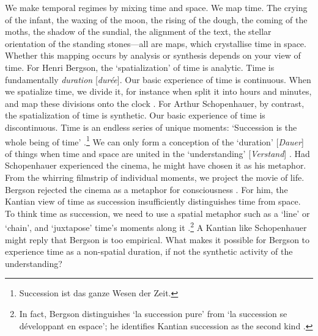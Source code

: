 \documentclass[
  Crown,
  times,
  sageh]{sagej}
\begin{document}
We make temporal regimes by mixing time and space. We map time. The
crying of the infant, the waxing of the moon, the rising of the dough,
the coming of the moths, the shadow of the sundial, the alignment of the
text, the stellar orientation of the standing stones---all are maps,
which crystallise time in space. Whether this mapping occurs by analysis
or synthesis depends on your view of time. For Henri Bergson, the
`spatialization' of time is analytic. Time is fundamentally
\emph{duration} {[}\emph{durée}{]}. Our basic experience of time is
continuous. When we spatialize time, we divide it, for instance when
split it into hours and minutes, and map these divisions onto the clock
\citeyearpar[71-72]{bergson_oeuvres_1984}. For Arthur Schopenhauer, by
contrast, the spatialization of time is synthetic. Our basic experience
of time is discontinuous. Time is an endless series of unique moments:
`Succession is the whole being of time' \citep[vol.1,
p.~37]{schopenhauer_werke_1999}.\footnote{Succession ist das ganze Wesen
  der Zeit.} We can only form a conception of the `duration'
{[}\emph{Dauer}{]} of things when time and space are united in the
`understanding' {[}\emph{Verstand}{]} \citeyearpar[vol.~1,
p.~40]{schopenhauer_werke_1999}. Had Schopenhauer experienced the
cinema, he might have chosen it as his metaphor. From the whirring
filmstrip of individual moments, we project the movie of life. Bergson
rejected the cinema as a metaphor for consciousness
\citeyearpar[752ff]{bergson_oeuvres_1984}. For him, the Kantian view of
time as succession insufficiently distinguishes time from space. To
think time as succession, we need to use a spatial metaphor such as a
`line' or `chain', and `juxtapose' time's moments along it
\citeyearpar[68]{bergson_oeuvres_1984}.\footnote{In fact, Bergson
  distinguishes `la succession pure' from `la succession se développant
  en espace'; he identifies Kantian succession as the second kind
  \citeyearpar[151]{bergson_oeuvres_1984}.} A Kantian like Schopenhauer
might reply that Bergson is too empirical. What makes it possible for
Bergson to experience time as a non-spatial duration, if not the
synthetic activity of the understanding?
\end{document}
